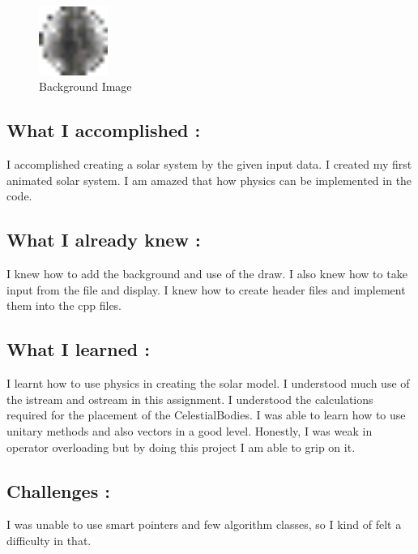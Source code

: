 \begin{figure}[h]
    \centering
    \includegraphics[width=0.2\textwidth]{ps3a/mercury.png}
    \caption{Background Image}
    \label{fig:mercury}
\end{figure}
\newpage
\subsection{What I accomplished :}\label{sec:ps3a:accomplish}

I accomplished creating a solar system by the given input data. I created my first animated solar system. I am amazed that how physics can be implemented in the code.

\subsection{What I already knew :}\label{sec:ps3a:knew}

I knew how to add the background and use of the draw. I also knew how to take input from the file and display.
I knew how to create header files and implement them into the cpp files.


\subsection{What I learned :}\label{sec:ps3a:learn}

I learnt how to use physics in creating the solar model. I understood much use of the istream and ostream in this assignment. I understood the calculations required for the placement of the CelestialBodies.
         I was able to learn how to use unitary methods and also vectors in a good level.
         Honestly, I was weak in operator overloading but by doing this project I am able to grip on it.

\subsection{Challenges :}\label{sec:ps3a:challenges}
        I was unable to use smart pointers and few algorithm classes, so I kind of felt a difficulty in that.

